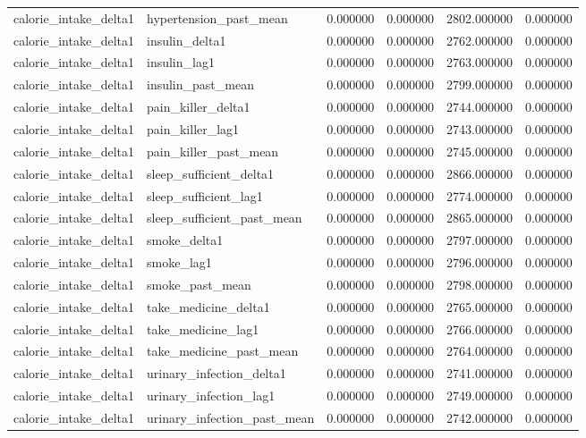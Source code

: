 \begin{longtable}{llrrrr}
calorie\_intake\_delta1 & hypertension\_past\_mean & 0.000000 & 0.000000 & 2802.000000 & 0.000000 \\
calorie\_intake\_delta1 & insulin\_delta1 & 0.000000 & 0.000000 & 2762.000000 & 0.000000 \\
calorie\_intake\_delta1 & insulin\_lag1 & 0.000000 & 0.000000 & 2763.000000 & 0.000000 \\
calorie\_intake\_delta1 & insulin\_past\_mean & 0.000000 & 0.000000 & 2799.000000 & 0.000000 \\
calorie\_intake\_delta1 & pain\_killer\_delta1 & 0.000000 & 0.000000 & 2744.000000 & 0.000000 \\
calorie\_intake\_delta1 & pain\_killer\_lag1 & 0.000000 & 0.000000 & 2743.000000 & 0.000000 \\
calorie\_intake\_delta1 & pain\_killer\_past\_mean & 0.000000 & 0.000000 & 2745.000000 & 0.000000 \\
calorie\_intake\_delta1 & sleep\_sufficient\_delta1 & 0.000000 & 0.000000 & 2866.000000 & 0.000000 \\
calorie\_intake\_delta1 & sleep\_sufficient\_lag1 & 0.000000 & 0.000000 & 2774.000000 & 0.000000 \\
calorie\_intake\_delta1 & sleep\_sufficient\_past\_mean & 0.000000 & 0.000000 & 2865.000000 & 0.000000 \\
calorie\_intake\_delta1 & smoke\_delta1 & 0.000000 & 0.000000 & 2797.000000 & 0.000000 \\
calorie\_intake\_delta1 & smoke\_lag1 & 0.000000 & 0.000000 & 2796.000000 & 0.000000 \\
calorie\_intake\_delta1 & smoke\_past\_mean & 0.000000 & 0.000000 & 2798.000000 & 0.000000 \\
calorie\_intake\_delta1 & take\_medicine\_delta1 & 0.000000 & 0.000000 & 2765.000000 & 0.000000 \\
calorie\_intake\_delta1 & take\_medicine\_lag1 & 0.000000 & 0.000000 & 2766.000000 & 0.000000 \\
calorie\_intake\_delta1 & take\_medicine\_past\_mean & 0.000000 & 0.000000 & 2764.000000 & 0.000000 \\
calorie\_intake\_delta1 & urinary\_infection\_delta1 & 0.000000 & 0.000000 & 2741.000000 & 0.000000 \\
calorie\_intake\_delta1 & urinary\_infection\_lag1 & 0.000000 & 0.000000 & 2749.000000 & 0.000000 \\
calorie\_intake\_delta1 & urinary\_infection\_past\_mean & 0.000000 & 0.000000 & 2742.000000 & 0.000000 \\

\end{longtable}
